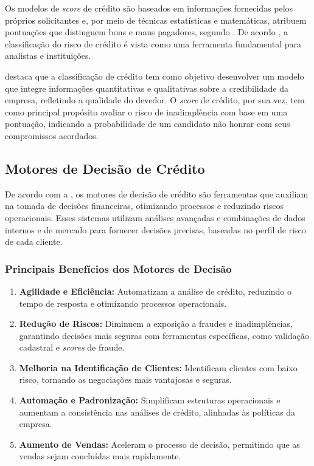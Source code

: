 \documentclass[12pt,a4paper]{article}
\begin{document}
Os modelos de \textit{score} de crédito são baseados em informações fornecidas pelos próprios solicitantes e, por meio de técnicas estatísticas e matemáticas, atribuem pontuações que distinguem bons e maus pagadores, segundo \cite{beserra2022}. De acordo \cite{francisco2012}, a classificação do risco de crédito é vista como uma ferramenta fundamental para analistas e instituições.

\cite{fuhr2022} destaca que a classificação de crédito tem como objetivo desenvolver um modelo que integre informações quantitativas e qualitativas sobre a credibilidade da empresa, refletindo a qualidade do devedor. O \textit{score} de crédito, por sua vez, tem como principal propósito avaliar o risco de inadimplência com base em uma pontuação, indicando a probabilidade de um candidato não honrar com seus compromissos acordados.

\subsection{Motores de Decisão de Crédito}

De acordo com a \cite{serasa2024}, os motores de decisão de crédito são ferramentas que auxiliam na tomada de decisões financeiras, otimizando processos e reduzindo riscos operacionais. Esses sistemas utilizam análises avançadas e combinações de dados internos e de mercado para fornecer decisões precisas, baseadas no perfil de risco de cada cliente.

\subsubsection{Principais Benefícios dos Motores de Decisão}

\begin{enumerate}
    \item \textbf{Agilidade e Eficiência:} Automatizam a análise de crédito, reduzindo o tempo de resposta e otimizando processos operacionais.
    \item \textbf{Redução de Riscos:} Diminuem a exposição a fraudes e inadimplências, garantindo decisões mais seguras com ferramentas específicas, como validação cadastral e \textit{scores} de fraude.
    \item \textbf{Melhoria na Identificação de Clientes:} Identificam clientes com baixo risco, tornando as negociações mais vantajosas e seguras.
    \item \textbf{Automação e Padronização:} Simplificam estruturas operacionais e aumentam a consistência nas análises de crédito, alinhadas às políticas da empresa.
    \item \textbf{Aumento de Vendas:} Aceleram o processo de decisão, permitindo que as vendas sejam concluídas mais rapidamente.
\end{enumerate}
\end{document}
